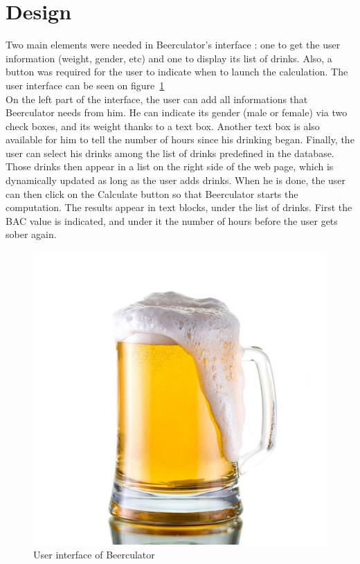 \section{Design}
\label{sec:design}

Two main elements were needed in Beerculator's interface : one to get the user information (weight, gender, etc) and one to display its list of drinks. Also, a button was required for the user to indicate when to launch the calculation. The user interface can be seen on {\sc figure}~\ref{fig:ui}\\

On the left part of the interface, the user can add all informations that Beerculator needs from him. He can indicate its gender (male or female) via two check boxes, and its weight thanks to a text box. Another text box is also available for him to tell the number of hours since his drinking began. Finally, the user can select his drinks among the list of drinks predefined in the database. \\

Those drinks then appear in a list on the right side of the web page, which is dynamically updated as long as the user adds drinks. When he is done, the user can then click on the \guillemotleft Calculate \guillemotright button so that Beerculator starts the computation. The results appear in text blocks, under the list of drinks. First the BAC value is indicated, and under it the number of hours before the user gets sober again.\\

\begin{figure}[H]
\centering
   \includegraphics[scale=0.3]{./figures/beer.jpg}
   \caption{User interface of Beerculator}
   \label{fig:ui}
\end{figure}